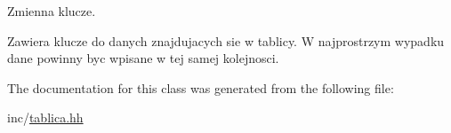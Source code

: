 Zmienna klucze. 

Zawiera klucze do danych znajdujacych sie w tablicy. W najprostrzym wypadku dane powinny byc wpisane w tej samej kolejnosci. 

The documentation for this class was generated from the following file\-:\begin{DoxyCompactItemize}
\item 
inc/\hyperlink{tablica_8hh}{tablica.\-hh}\end{DoxyCompactItemize}
